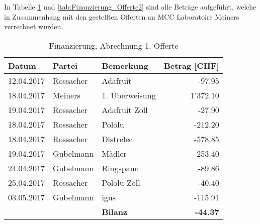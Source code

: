 In Tabelle \ref{tab:Finanzierung_Offerte1} und \ref{tab:Finanzierung_Offerte2} sind alle Beträge aufgeführt, welche in Zusammenhang mit den gestellten Offerten an MCC Laboratoire Meiners verrechnet wurden. 

\begin{table}[H]
	\small
	\centering
	\caption{Finanzierung, Abrechnung 1. Offerte}
	\begin{tabular}{lrlr}
		\hline
		\multicolumn{1}{|l|}{\textbf{Datum}} & \multicolumn{1}{l|}{\textbf{Partei}} & \multicolumn{1}{l|}{\textbf{Bemerkung}} & \multicolumn{1}{l|}{\textbf{Betrag [CHF]}} \\
		\hline
		\multicolumn{1}{|l|}{12.04.2017} & \multicolumn{1}{l|}{Rossacher} & \multicolumn{1}{l|}{Adafruit} & \multicolumn{1}{r|}{-97.95} \\
		\hline
		\multicolumn{1}{|l|}{18.04.2017} & \multicolumn{1}{l|}{Meiners} & \multicolumn{1}{l|}{1. Überweisung} & \multicolumn{1}{r|}{1'372.10} \\
		\hline
		\multicolumn{1}{|l|}{19.04.2017} & \multicolumn{1}{l|}{Rossacher} & \multicolumn{1}{l|}{Adafruit Zoll} & \multicolumn{1}{r|}{-27.90} \\
		\hline
		\multicolumn{1}{|l|}{18.04.2017} & \multicolumn{1}{l|}{Rossacher} & \multicolumn{1}{l|}{Pololu} & \multicolumn{1}{r|}{-212.20} \\
		\hline
		\multicolumn{1}{|l|}{18.04.2017} & \multicolumn{1}{l|}{Rossacher} & \multicolumn{1}{l|}{Distrelec} & \multicolumn{1}{r|}{-578.85} \\
		\hline
		\multicolumn{1}{|l|}{19.04.2017} & \multicolumn{1}{l|}{Gubelmann} & \multicolumn{1}{l|}{Mädler} & \multicolumn{1}{r|}{-253.40} \\
		\hline
		\multicolumn{1}{|l|}{24.04.2017} & \multicolumn{1}{l|}{Gubelmann} & \multicolumn{1}{l|}{Ringspann} & \multicolumn{1}{r|}{-89.86} \\
		\hline
		\multicolumn{1}{|l|}{25.04.2017} & \multicolumn{1}{l|}{Rossacher} & \multicolumn{1}{l|}{Pololu Zoll} & \multicolumn{1}{r|}{-40.40} \\
		\hline
		\multicolumn{1}{|l|}{03.05.2017} & \multicolumn{1}{l|}{Gubelmann} & \multicolumn{1}{l|}{igus} & \multicolumn{1}{r|}{-115.91} \\
		\hline
		&       & \textbf{Bilanz} & \textbf{-44.37} \\
	\end{tabular}%
	\label{tab:Finanzierung_Offerte1}%
\end{table}%


